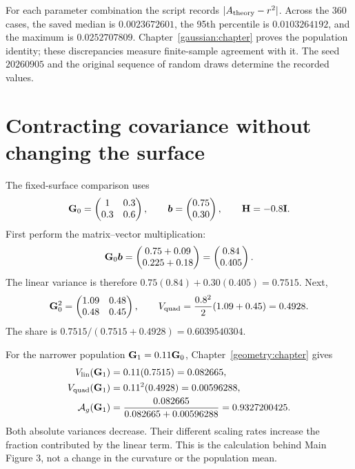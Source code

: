 For each parameter combination the script records $|A_{\rm theory}-r^2|$. Across the 360 cases, the saved median is $0.0023672601$, the 95th percentile is $0.0103264192$, and the maximum is $0.0252707809$. Chapter~\ref{gaussian:chapter} proves the population identity; these discrepancies measure finite-sample agreement with it. The seed $20260905$ and the original sequence of random draws determine the recorded values.

\section{Contracting covariance without changing the surface}
\label{worked:main3}

The fixed-surface comparison uses
\[
 \mathbf{G}_0=
 \begin{pmatrix}1&0.3\\0.3&0.6\end{pmatrix},
 \qquad
 \boldsymbol{b}=\begin{pmatrix}0.75\\0.30\end{pmatrix},
 \qquad \mathbf{H}=-0.8\mathbf{I} .
\]
First perform the matrix--vector multiplication:
\[
 \mathbf{G}_0\boldsymbol{b}
 =\begin{pmatrix}0.75+0.09\\0.225+0.18\end{pmatrix}
 =\begin{pmatrix}0.84\\0.405\end{pmatrix}.
\]
The linear variance is therefore
$0.75(0.84)+0.30(0.405)=0.7515$. Next,
\[
 \mathbf{G}_0^2=
 \begin{pmatrix}1.09&0.48\\0.48&0.45\end{pmatrix},
 \qquad
 V_{\mathrm{quad}}=\frac{0.8^2}{2}(1.09+0.45)=0.4928.
\]
The share is $0.7515/(0.7515+0.4928)=0.6039540304$.

For the narrower population $\mathbf{G}_1=0.11\mathbf{G}_0$, Chapter~\ref{geometry:chapter} gives
\begin{align}
 V_{\mathrm{lin}}(\mathbf{G}_1)&=0.11(0.7515)=0.082665,\\
 V_{\mathrm{quad}}(\mathbf{G}_1)&=0.11^2(0.4928)=0.00596288,\\
 \mathcal A_g(\mathbf{G}_1)&=\frac{0.082665}{0.082665+0.00596288}
              =0.9327200425.
\end{align}
Both absolute variances decrease. Their different scaling rates increase the fraction contributed by the linear term. This is the calculation behind Main Figure 3, not a change in the curvature or the population mean.

